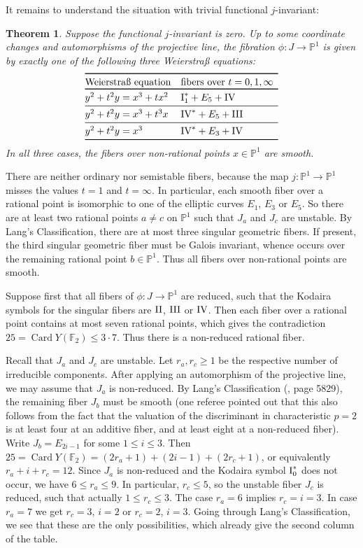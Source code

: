 \documentclass[oneside, 12pt]{amsart}
\newcommand\mylabel[1]{\label{#1}\marginpar{\vspace{-1ex}\medskip\medskip\footnotesize \tt #1}}
\renewcommand\mylabel[1]{\label{#1}}
\newtheorem{theorem}{Theorem}[section]
\theoremstyle{definition}
\theoremstyle{remark}
\newcommand{\FF}{\mathbb{F}}
\newcommand{\PP}{\mathbb{P}}
\newcommand{\Card}{\operatorname{Card}}
\newcommand{\I}{\text{\rm I}}
\newcommand{\II}{\text{\rm II}}
\newcommand{\III}{\text{\rm III}}
\newcommand{\IV}{\text{\rm IV}}
\newcommand{\ra}{\rightarrow}
\begin{document}
\medskip
It remains to understand the situation with trivial functional $j$-invariant:

\begin{theorem}
\mylabel{classification  zero j}
Suppose the functional $j$-invariant is zero.
Up to some coordinate changes and automorphisms of the projective line,
the fibration $\phi:J\ra\PP^1$ is given by exactly one of the following three Weierstra\ss{} equations: 
$$
\begin{array}[c]{@{}ll}
\toprule
\text{\rm Weierstra\ss{} equation}		& \text{\rm fibers over $t=0,1,\infty$}\\
\toprule
y^2+t^2y=x^3+tx^2			& \I_1^*+E_5+\IV\\	
\midrule
y^2+t^2y=x^3+t^3x 			& \IV^*+E_5+\III\\
\midrule
y^2+t^2y=x^3 			& \IV^*+E_3+\IV\\
\bottomrule
\end{array}
$$
In all three cases, the fibers over non-rational points $x\in\PP^1$ are smooth.
\end{theorem}

\proof
There are neither ordinary nor semistable fibers, because the  map $j:\PP^1\ra\PP^1$ misses
the values $t=1$ and $t=\infty$. In particular, each smooth fiber  over a rational point 
is isomorphic to one of the elliptic curves $E_1$, $E_3$ or $E_5$. So there are
at least two rational points $a\neq c$ on $\PP^1$ such that $J_a$ and $J_c$ are unstable.
By Lang's Classification, there are at most three singular geometric fibers. If present, 
the third singular geometric fiber must be Galois invariant, whence occurs over
the remaining rational point $b\in\PP^1$. Thus all fibers over non-rational points are smooth.

Suppose first that all fibers of $\phi:J\ra\PP^1$ are reduced, such that the Kodaira symbols for
the singular fibers are $\II$, $\III$ or $\IV$. Then each fiber over  a rational point contains
at most seven rational points, which gives the contradiction $25=\Card Y(\FF_2)\leq 3\cdot 7$.
Thus there is a non-reduced rational fiber.

Recall that $J_a$ and $J_c$ are unstable. Let $r_a,r_c\geq 1$ be the respective number of irreducible components.
After applying an automorphism of the projective line, we may assume that $J_a $  is non-reduced. 
By Lang's Classification (\cite{Lang 2000}, page 5829), the remaining fiber $J_b$ must be smooth 
(one referee pointed out that this also follows from the fact that the valuation of the discriminant
in characteristic $p=2$ is at least four at an additive fiber, and at least eight at a non-reduced fiber).
Write $J_b=E_{2i-1}$ for some $1\leq i\leq 3$.
Then $25=\Card Y(\FF_2) = (2r_a+1) +(2i-1) + (2r_c+1) $, or equivalently $r_a+i+r_c=12$.
Since $J_a$ is non-reduced and the Kodaira symbol $\I_0^*$ does not occur, we have $6\leq r_a\leq 9$.
In particular, $r_c\leq 5$, so the unstable fiber $J_c$ is reduced, such that actually $1\leq r_c\leq 3$.
The case $r_a=6$ implies $r_c=i=3$. In case $r_a=7$ we get $r_c=3$, $i=2$ or $r_c=2$, $i=3$.
Going through Lang's Classification, we see that these are the only possibilities,
which already give the second column of the table.
\end{document}
